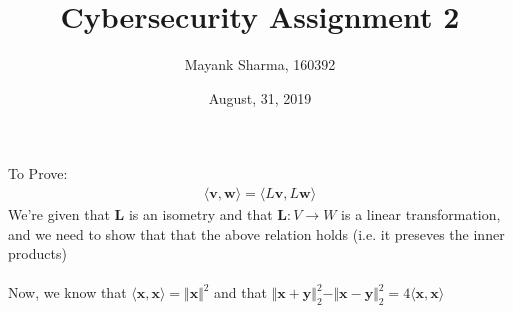 \documentclass[12pt, a4paper]{article}
\title{Cybersecurity Assignment 2}
\author{Mayank Sharma, 160392}
\date{August, 31, 2019}
\begin{document}
\renewcommand{\v}{\textbf}
\maketitle
\section{}

To Prove:
\begin{align*}
    \langle \v{v}, \v{w} \rangle = \langle L\v{v}, L\v{w} \rangle 
\end{align*}
We're given that $\v{L}$ is an isometry and that $\v{L} : V \rightarrow W$ is a linear transformation, and we need to show that that the above relation holds (i.e. it preseves the inner products)\\\\
Now, we know that $\langle \v{x}, \v{x} \rangle= \Vert \v{x}\Vert^2$ and that $\Vert \v{x} + \v{y} \Vert_2^2 - \Vert \v{x} - \v{y} \Vert_2^2 = 4 \langle \v{x}, \v{x} \rangle $
\end{document}
